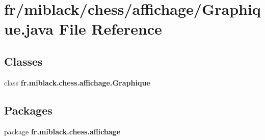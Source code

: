 \section{fr/miblack/chess/affichage/\-Graphique.java File Reference}
\label{Graphique_8java}
\subsection*{Classes}
\begin{DoxyCompactItemize}
\item 
class {\bf fr.\-miblack.\-chess.\-affichage.\-Graphique}
\end{DoxyCompactItemize}
\subsection*{Packages}
\begin{DoxyCompactItemize}
\item 
package {\bf fr.\-miblack.\-chess.\-affichage}
\end{DoxyCompactItemize}
